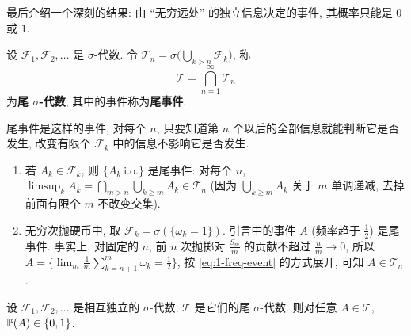 最后介绍一个深刻的结果: 由 ``无穷远处'' 的独立信息决定的事件, 其概率只能是 $0$ 或 $1$.

\begin{definition}[尾 $\sigma$-代数]\label{def:tail}
设 $\mathcal{F}_1,\mathcal{F}_2,\dots$ 是 $\sigma$-代数. 令 $\mathcal{T}_n=\sigma\big(\bigcup_{k>n}\mathcal{F}_k\big)$, 称
\[
\mathcal{T}=\bigcap_{n=1}^\infty\mathcal{T}_n
\]
为\textbf{尾 $\sigma$-代数}, 其中的事件称为\textbf{尾事件}.
\end{definition}

尾事件是这样的事件, 对每个 $n$, 只要知道第 $n$ 个以后的全部信息就能判断它是否发生, 改变有限个 $\mathcal{F}_k$ 中的信息不影响它是否发生.

\begin{example}\label{ex:tail-events}
\begin{enumerate}
\item 若 $A_k\in\mathcal{F}_k$, 则 $\{A_k\ \text{i.o.}\}$ 是尾事件: 对每个 $n$, $\limsup_k A_k=\bigcap_{m>n}\bigcup_{k\ge m}A_k\in\mathcal{T}_n$ (因为 $\bigcup_{k\ge m}A_k$ 关于 $m$ 单调递减, 去掉前面有限个 $m$ 不改变交集).
\item 无穷次抛硬币中, 取 $\mathcal{F}_k=\sigma(\{\omega_k=1\})$. 引言中的事件 $A$ (频率趋于 $\frac{1}{2}$) 是尾事件. 事实上, 对固定的 $n$, 前 $n$ 次抛掷对 $\frac{S_m}{m}$ 的贡献不超过 $\frac{n}{m}\to0$, 所以
$A=\big\{\lim_m\frac{1}{m}\sum_{k=n+1}^m\omega_k=\frac{1}{2}\big\}$, 按 \eqref{eq:1-freq-event} 的方式展开, 可知 $A\in\mathcal{T}_n$.
\end{enumerate}
\end{example}

\begin{theorem}[Kolmogorov 0-1 律]\label{thm:kolmogorov-01}
设 $\mathcal{F}_1,\mathcal{F}_2,\dots$ 是相互独立的 $\sigma$-代数, $\mathcal{T}$ 是它们的尾 $\sigma$-代数. 则对任意 $A\in\mathcal{T}$, $\P(A)\in\{0,1\}$.
\end{theorem}

